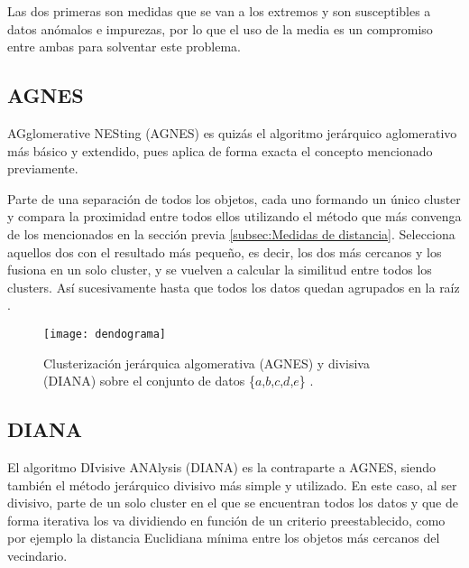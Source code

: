 \documentclass[10pt, a4paper]{article}
\begin{document}
Las dos primeras son medidas que se van a los extremos y son susceptibles a datos anómalos e impurezas, por lo que el uso de la media es un compromiso entre ambas para solventar este problema.




\subsection{\textbf{AGNES}} \label{subsec:AGNES}

\cite{jerarquico} AGglomerative NESting (AGNES) es quizás el algoritmo jerárquico aglomerativo más básico y extendido, pues aplica de forma exacta el concepto mencionado previamente. 

Parte de una separación de todos los objetos, cada uno formando un único cluster y compara la proximidad entre todos ellos utilizando el método que más convenga de los mencionados en la sección previa \ref{subsec:Medidas de distancia}. Selecciona aquellos dos con el resultado más pequeño, es decir, los dos más cercanos y los fusiona en un solo cluster, y se vuelven a calcular la similitud entre todos los clusters. Así sucesivamente hasta que todos los datos quedan agrupados en la raíz \cite{18}.


\begin{figure}[!ht]
\centering
\texttt{[image: dendograma]}
\caption{Clusterización jerárquica algomerativa (AGNES) y divisiva (DIANA) sobre el conjunto de datos \{$a$,$b$,$c$,$d$,$e$\} \cite{LIBRO}.}
\label{fig:dendograma}
\end{figure}





\subsection{\textbf{DIANA}} \label{subsec:DIANA}

\cite{jerarquico} El algoritmo DIvisive ANAlysis (DIANA) es la contraparte a AGNES, siendo también el método jerárquico divisivo más simple y utilizado. En este caso, al ser divisivo, parte de un solo cluster en el que se encuentran todos los datos y que de forma iterativa los va dividiendo en función de un criterio preestablecido, como por ejemplo la distancia Euclidiana mínima entre los objetos más cercanos del vecindario.
\end{document}
